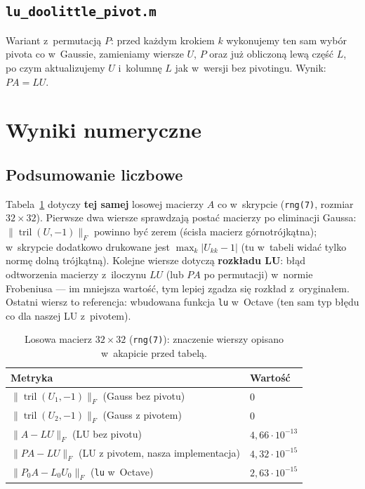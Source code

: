 \documentclass[polish]{template/projectreport}
\begin{document}
\subsection{\texttt{lu\_doolittle\_pivot.m}}
Wariant z~permutacją $P$: przed każdym krokiem $k$ wykonujemy ten sam wybór pivota co w~Gaussie, zamieniamy wiersze $U$, $P$ oraz już obliczoną lewą część $L$, po czym aktualizujemy $U$ i~kolumnę $L$ jak w~wersji bez pivotingu. Wynik: $PA=LU$.



\section{Wyniki numeryczne}

\subsection{Podsumowanie liczbowe}
Tabela~\ref{tab:metryki} dotyczy \textbf{tej samej} losowej macierzy $A$ co w~skrypcie (\texttt{rng(7)}, rozmiar $32\times 32$).
Pierwsze dwa wiersze sprawdzają postać macierzy po eliminacji Gaussa: $\|\operatorname{tril}(U,-1)\|_F$ powinno być zerem (ścisła macierz górnotrójkątna); w~skrypcie dodatkowo drukowane jest $\max_k|U_{kk}-1|$ (tu w~tabeli widać tylko normę dolną trójkątną).
Kolejne wiersze dotyczą \textbf{rozkładu LU}: błąd odtworzenia macierzy z~iloczynu $LU$ (lub $PA$ po permutacji) w~normie Frobeniusa --- im mniejsza wartość, tym lepiej zgadza się rozkład z~oryginałem.
Ostatni wiersz to referencja: wbudowana funkcja \texttt{lu} w~Octave (ten sam typ błędu co dla naszej LU z~pivotem).

\begin{table}[htbp]\centering
\caption{Losowa macierz $32\times 32$ (\texttt{rng(7)}): znaczenie wierszy opisano w~akapicie przed tabelą.}
\label{tab:metryki}
\begin{tabular}{@{}l l@{}}\toprule
  Metryka & Wartość \\ \midrule
  $\|\operatorname{tril}(U_1,-1)\|_F$ (Gauss bez pivotu) & $0$ \\
  $\|\operatorname{tril}(U_2,-1)\|_F$ (Gauss z pivotem) & $0$ \\
  $\|A - LU\|_F$ (LU bez pivotu) & $4{,}66\cdot 10^{-13}$ \\
  $\|PA - LU\|_F$ (LU z pivotem, nasza implementacja) & $4{,}32\cdot 10^{-15}$ \\
  $\|P_0 A - L_0 U_0\|_F$ (\texttt{lu} w~Octave) & $2{,}63\cdot 10^{-15}$ \\
\bottomrule
\end{tabular}
\end{table}
\end{document}
